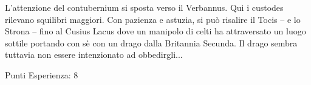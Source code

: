 \documentclass[11.5pt,twocolumn]{article}
\begin{document}
%
L'attenzione del contubernium si sposta verso il Verbannus.
Qui i custodes rilevano squilibri maggiori.
Con pazienza e astuzia, si pu\`{o} risalire il Tocis -- e lo Strona -- fino al Cusius Lacus dove un manipolo di celti ha attraversato un luogo sottile portando con s\`{e} con un drago dalla Britannia Secunda.
Il drago sembra tuttavia non essere intenzionato ad obbedirgli...

Punti Esperienza: 8

{}

\end{document}
